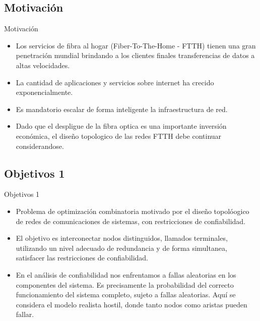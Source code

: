 \subsection{Motivación}
\begin{frame}%
    \begin{block}{Motivación}
    \begin{itemize} 
    	\item Los servicios de fibra al hogar (Fiber-To-The-Home - FTTH) tienen una gran penetración mundial brindando a los clientes finales transferencias de datos a altas velocidades.
    	\item La cantidad de aplicaciones y servicios sobre internet ha crecido exponencialmente.
    	\item Es mandatorio escalar de forma inteligente la infraestructura de red.
    	\item Dado que el despligue de la fibra optica es una importante inversión económica, el diseño topologico de las redes FTTH debe continuar considerandose.
	\end{itemize} 
    \end{block}
\end{frame}

\subsection{Objetivos 1}
\begin{frame}%
    \begin{block}{Objetivos 1}
	\begin{itemize} 
    	\item Problema de optimización combinatoria motivado por el diseño topolóogico de redes de comunicaciones 
de sistemas, con restricciones de confiabilidad.
		\item El objetivo es interconectar nodos distinguidos, llamados terminales, utilizando un nivel adecuado de redundancia y de forma simultanea, satisfacer las restricciones de confiabilidad.
	\item En el análisis de confiabilidad nos enfrentamos a fallas aleatorias en los componentes del sistema. Es precisamente la probabilidad del correcto funcionamiento del sistema completo, sujeto a fallas aleatorias. Aquí se considera el modelo realista hostil, donde tanto nodos como aristas pueden fallar.
	\end{itemize} 
    \end{block}
\end{frame}

